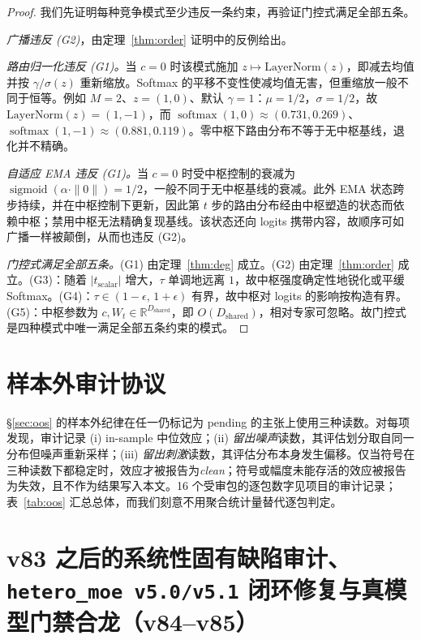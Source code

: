 \documentclass[10pt,twoside]{article}
\newcommand{\softmax}{\operatorname{softmax}}
\newcommand{\sigmoid}{\operatorname{sigmoid}}
\newcommand{\R}{\mathbb{R}}
\theoremstyle{definition}
\theoremstyle{plain}
\theoremstyle{remark}
\begin{document}
\begin{proof}
我们先证明每种竞争模式至少违反一条约束，再验证门控式满足全部五条。

\emph{广播违反 (G2)}，由定理~\ref{thm:order} 证明中的反例给出。

\emph{路由归一化违反 (G1)。}当 $c = 0$ 时该模式施加 $z \mapsto \mathrm{LayerNorm}(z)$，即减去均值并按 $\gamma / \sigma(z)$ 重新缩放。Softmax 的平移不变性使减均值无害，但重缩放一般不同于恒等。例如 $M = 2$、$z = (1, 0)$、默认 $\gamma = 1$：$\mu = 1/2$，$\sigma = 1/2$，故 $\mathrm{LayerNorm}(z) = (1, -1)$，而 $\softmax(1, 0) \approx (0.731, 0.269)$、$\softmax(1, -1) \approx (0.881, 0.119)$。零中枢下路由分布不等于无中枢基线，退化并不精确。

\emph{自适应 EMA 违反 (G1)。}当 $c = 0$ 时受中枢控制的衰减为 $\sigmoid(\alpha \cdot \|0\|) = 1/2$，一般不同于无中枢基线的衰减。此外 EMA 状态跨步持续，并在中枢控制下更新，因此第 $t$ 步的路由分布经由中枢塑造的状态而依赖中枢；禁用中枢无法精确复现基线。该状态还向 logits 携带内容，故顺序可如广播一样被颠倒，从而也违反 (G2)。

\emph{门控式满足全部五条。}(G1) 由定理~\ref{thm:deg} 成立。(G2) 由定理~\ref{thm:order} 成立。(G3)：随着 $|t_{\text{scalar}}|$ 增大，$\tau$ 单调地远离 $1$，故中枢强度确定性地锐化或平缓 Softmax。(G4)：$\tau \in (1 - \epsilon,\, 1 + \epsilon)$ 有界，故中枢对 logits 的影响按构造有界。(G5)：中枢参数为 $c, W_t \in \R^{D_{\text{shared}}}$，即 $O(D_{\text{shared}})$，相对专家可忽略。故门控式是四种模式中唯一满足全部五条约束的模式。
\end{proof}

\section{样本外审计协议}
\label{app:audit}

\S\ref{sec:oos} 的样本外纪律在任一仍标记为 pending 的主张上使用三种读数。对每项发现，审计记录 (i) in-sample 中位效应；(ii) \emph{留出噪声}读数，其评估划分取自同一分布但噪声重新采样；(iii) \emph{留出刺激}读数，其评估分布本身发生偏移。仅当符号在三种读数下都稳定时，效应才被报告为\emph{clean}；符号或幅度未能存活的效应被报告为失效，且不作为结果写入本文。16 个受审包的逐包数字见项目的审计记录；表~\ref{tab:oos} 汇总总体，而我们刻意不用聚合统计量替代逐包判定。

\section{v83 之后的系统性固有缺陷审计、\texttt{hetero\_moe v5.0/v5.1} 闭环修复与真模型门禁合龙（v84--v85）}
\label{app:v84}
\end{document}
